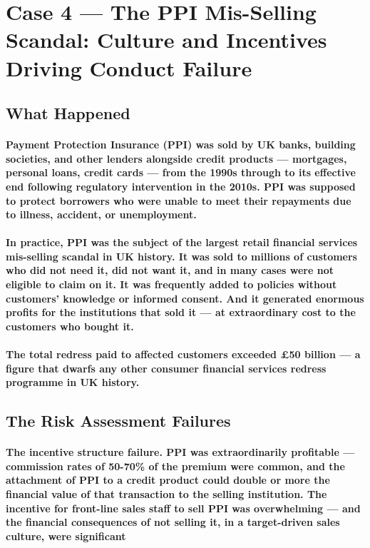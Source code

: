 \section{Case 4 — The PPI Mis-Selling Scandal: Culture and Incentives Driving Conduct Failure}

\subsection{What Happened}
\paragraph{Payment Protection Insurance (PPI) was sold by UK banks, building societies, and other lenders alongside credit products — mortgages, personal loans, credit cards — from the 1990s through to its effective end following regulatory intervention in the 2010s. PPI was supposed to protect borrowers who were unable to meet their repayments due to illness, accident, or unemployment.}
\paragraph{In practice, PPI was the subject of the largest retail financial services mis-selling scandal in UK history. It was sold to millions of customers who did not need it, did not want it, and in many cases were not eligible to claim on it. It was frequently added to policies without customers' knowledge or informed consent. And it generated enormous profits for the institutions that sold it — at extraordinary cost to the customers who bought it.}
\paragraph{The total redress paid to affected customers \textbf{exceeded £50 billion} — a figure that dwarfs any other consumer financial services redress programme in UK history.}

\subsection{The Risk Assessment Failures}
\paragraph{\textbf{The incentive structure failure}. PPI was extraordinarily profitable — commission rates of 50-70\% of the premium were common, and the attachment of PPI to a credit product could double or more the financial value of that transaction to the selling institution. The incentive for front-line sales staff to sell PPI was overwhelming — and the financial consequences of not selling it, in a target-driven sales culture, were significant}
